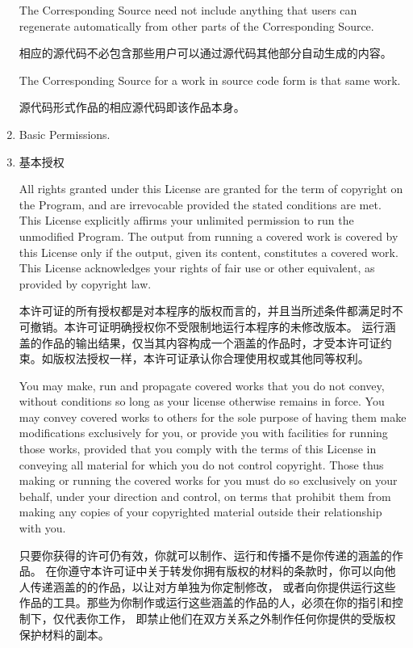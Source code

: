 \documentclass[11pt]{article}
\begin{document}
\begin{enumerate}
        The Corresponding Source need not include anything that users
        can regenerate automatically from other parts of the Corresponding
        Source.

        相应的源代码不必包含那些用户可以通过源代码其他部分自动生成的内容。


        The Corresponding Source for a work in source code form is that
        same work.

        源代码形式作品的相应源代码即该作品本身。

  \item Basic Permissions.
  \item 基本授权

        All rights granted under this License are granted for the term of
        copyright on the Program, and are irrevocable provided the stated
        conditions are met.  This License explicitly affirms your unlimited
        permission to run the unmodified Program.  The output from running a
        covered work is covered by this License only if the output, given its
        content, constitutes a covered work.  This License acknowledges your
        rights of fair use or other equivalent, as provided by copyright law.

        本许可证的所有授权都是对本程序的版权而言的，并且当所述条件都满足时不可撤销。本许可证明确授权你不受限制地运行本程序的未修改版本。
        运行涵盖的作品的输出结果，仅当其内容构成一个涵盖的作品时，才受本许可证约束。如版权法授权一样，本许可证承认你合理使用权或其他同等权利。

        You may make, run and propagate covered works that you do not
        convey, without conditions so long as your license otherwise remains
        in force.  You may convey covered works to others for the sole purpose
        of having them make modifications exclusively for you, or provide you
        with facilities for running those works, provided that you comply with
        the terms of this License in conveying all material for which you do
        not control copyright.  Those thus making or running the covered works
        for you must do so exclusively on your behalf, under your direction
        and control, on terms that prohibit them from making any copies of
        your copyrighted material outside their relationship with you.

        只要你获得的许可仍有效，你就可以制作、运行和传播不是你传递的涵盖的作品。
        在你遵守本许可证中关于转发你拥有版权的材料的条款时，你可以向他人传递涵盖的的作品，以让对方单独为你定制修改，
        或者向你提供运行这些作品的工具。那些为你制作或运行这些涵盖的作品的人，必须在你的指引和控制下，仅代表你工作，
        即禁止他们在双方关系之外制作任何你提供的受版权保护材料的副本。


\end{enumerate}
\end{document}
